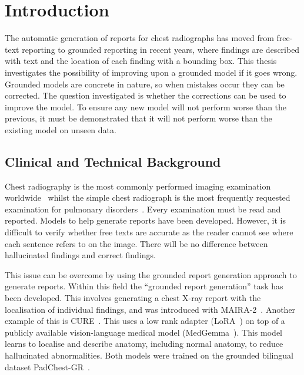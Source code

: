 \chapter{Introduction}
\label{ch:introduction}

The automatic generation of reports for chest radiographs has moved from free-text
reporting to grounded reporting in recent years, where findings are described with text
and the location of each finding with a bounding box. This thesis investigates the
possibility of improving upon a grounded model if it goes wrong. Grounded models are
concrete in nature, so when mistakes occur they can be corrected. The question
investigated is whether the corrections can be used to improve the model. To ensure
any new model will not perform worse than the previous, it must be demonstrated that
it will not perform worse than the existing model on unseen data.

\section{Clinical and Technical Background}
\label{sec:perspective}

Chest radiography is the most commonly performed imaging examination
worldwide~\cite{irvin2019chexpert} whilst the simple chest radiograph is the most
frequently requested examination for pulmonary disorders~\cite{raoof2012chest}. Every
examination must be read and reported. Models to help generate reports have been
developed. However, it is difficult to verify whether free texts are accurate as the
reader cannot see where each sentence refers to on the image. There will be no
difference between hallucinated findings and correct findings.

This issue can be overcome by using the grounded report generation approach to
generate reports. Within this field the ``grounded report generation'' task has been
developed. This involves generating a chest X-ray report with the localisation of
individual findings, and was introduced with MAIRA-2~\cite{bannur2024maira2}. Another
example of this is CURE~\cite{messina2026cure}. This uses a low rank adapter
(LoRA~\cite{hu2021lora}) on top of a publicly available vision-language medical model
(MedGemma~\cite{sellergren2025medgemma}). This model learns to localise and describe
anatomy, including normal anatomy, to reduce hallucinated abnormalities. Both models
were trained on the grounded bilingual dataset PadChest-GR~\cite{castro2024padchestgr}.

